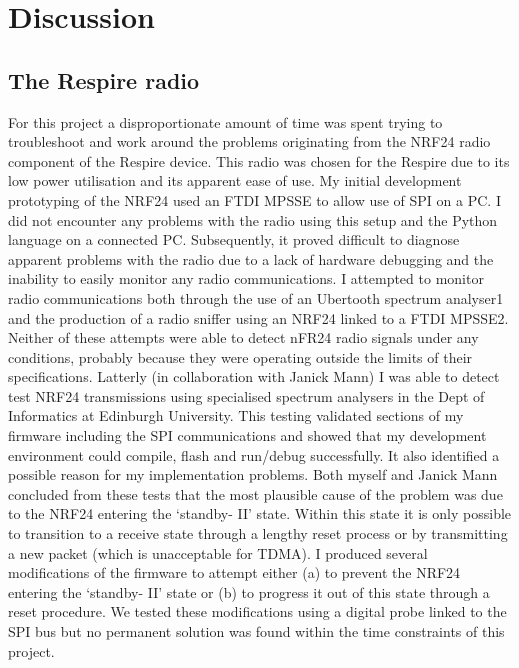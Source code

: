 \chapter{Discussion}

\section{The Respire radio}
For this project a disproportionate amount of time was spent trying to troubleshoot and work
around the problems originating from the NRF24 radio component of the Respire device. This radio
was chosen for the Respire due to its low power utilisation and its apparent ease of use. My initial
development prototyping of the NRF24 used an FTDI MPSSE to allow use of SPI on a PC. I did not
encounter any problems with the radio using this setup and the Python language on a connected PC.
Subsequently, it proved difficult to diagnose apparent problems with the radio due to a lack of
hardware debugging and the inability to easily monitor any radio communications. I attempted to
monitor radio communications both through the use of an Ubertooth spectrum analyser1 and the
production of a radio sniffer using an NRF24 linked to a FTDI MPSSE2. Neither of these attempts
were able to detect nFR24 radio signals under any conditions, probably because they were operating
outside the limits of their specifications. Latterly (in collaboration with Janick Mann) I was able to
detect test NRF24 transmissions using specialised spectrum analysers in the Dept of Informatics at
Edinburgh University. This testing validated sections of my firmware including the SPI
communications and showed that my development environment could compile, flash and
run/debug successfully. It also identified a possible reason for my implementation problems. Both
myself and Janick Mann concluded from these tests that the most plausible cause of the problem
was due to the NRF24 entering the ‘standby- II’ state. Within this state it is only possible to
transition to a receive state through a lengthy reset process or by transmitting a new packet (which
is unacceptable for TDMA). I produced several modifications of the firmware to attempt either (a) to
prevent the NRF24 entering the ‘standby- II’ state or (b) to progress it out of this state through a
reset procedure. We tested these modifications using a digital probe linked to the SPI bus but no
permanent solution was found within the time constraints of this project.


